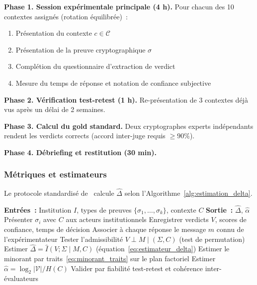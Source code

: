 \begin{sloppypar}
\noindent\textbf{Phase 1. Session exp\'erimentale principale (4 h).}
Pour chacun des 10 contextes assign\'es (rotation \'equilibr\'ee)~:
\begin{enumerate}
\item[(a)] Pr\'esentation du contexte $c \in \mathcal{C}$
\item[(b)] Pr\'esentation de la preuve cryptographique $\sigma$
\item[(c)] Compl\'etion du questionnaire d'extraction de verdict
\item[(d)] Mesure du temps de r\'eponse et notation de confiance subjective
\end{enumerate}

\noindent\textbf{Phase 2. V\'erification test-retest (1 h).}
Re-pr\'esentation de 3 contextes d\'ej\`a vus apr\`es un d\'elai de 2 semaines.

\noindent\textbf{Phase 3. Calcul du gold standard.}
Deux cryptographes experts ind\'ependants rendent les verdicts \og corrects\fg{}
(accord inter-juge requis $\geq 90\%$).

\noindent\textbf{Phase 4. D\'ebriefing et restitution (30 min).}

\subsubsection{M\'etriques et estimateurs}
\label{subsubsec:metriques_delta}

Le protocole standardis\'e de~\cite{MINKA2026CRO} calcule $\hat\Delta$ selon
l'Algorithme~\ref{alg:estimation_delta}.

\begin{algorithm}[H]
\caption{Estimation empirique de $\Delta$}
\label{alg:estimation_delta}
\begin{algorithmic}[1]
\State \textbf{Entr\'ees~:} Institution $I$, types de preuves
       $\{\sigma_1, \ldots, \sigma_k\}$, contexte $C$
\State \textbf{Sortie~:} $\hat\Delta$, $\hat\alpha$
\State Pr\'esenter $\sigma_i$ avec $C$ aux acteurs institutionnels
\State Enregistrer verdicts $V$, scores de confiance, temps de d\'ecision
\State Associer \`a chaque r\'eponse le message $m$ connu de l'exp\'erimentateur
\State Tester l'admissibilit\'e $V \perp M \mid (\Sigma, C)$ (test de permutation)
\State Estimer $\hat\Delta = \hat I(V;\Sigma \mid M, C)$ (\'equation~\eqref{eq:estimateur_delta})
\State Estimer le minorant par traits~\eqref{eq:minorant_traits} sur le plan factoriel
\State Estimer $\hat\alpha = \log_2|\mathcal{V}| / H(C)$
\State Valider par fiabilit\'e test-retest et coh\'erence inter-\'evaluateurs
\end{algorithmic}
\end{algorithm}


\end{sloppypar}
